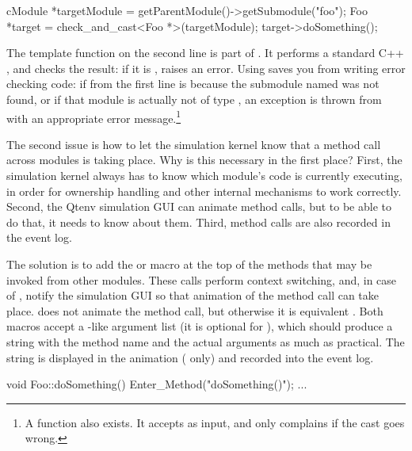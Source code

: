 \begin{ned}
\begin{cpp}
cModule *targetModule = getParentModule()->getSubmodule("foo");
Foo *target = check_and_cast<Foo *>(targetModule);
target->doSomething();
\end{cpp}

The  template function on the second line
is part of {\opp}. It performs a standard C++ , and checks
the result: if it is ,  raises an {\opp} error.
Using  saves you from writing error checking
code: if  from the first line is  because
the submodule named  was not found, or if that
module is actually not of type , an exception is thrown
from  with an appropriate error message.\footnote{A
 function also exists. It
accepts  as input, and only complains if the cast
goes wrong.}

The second issue is how to let the simulation kernel know that
a method call across modules is taking place. Why is this necessary
in the first place? First, the simulation kernel always has to know which
module's code is currently executing, in order for ownership handling
and other internal mechanisms to work correctly. Second, the Qtenv
simulation GUI can animate method calls, but to be able to do that,
it needs to know about them. Third, method calls are also recorded
in the event log.

The solution is to add the  or 
macro at the top of the methods that may be invoked from other
modules. These calls perform context switching, and, in case of
, notify the simulation GUI so that animation
of the method call can take place. 
does not animate the method call, but otherwise it is equivalent
. Both macros accept a -like
argument list (it is optional for ),
which should produce a string with the method name and the
actual arguments as much as practical. The string is displayed in
the animation ( only) and recorded into the event log.


\begin{cpp}
void Foo::doSomething()
{
    Enter_Method("doSomething()");
    ...
}
\end{cpp}




\end{ned}
